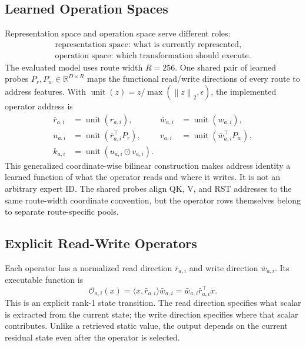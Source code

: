 \documentclass{article}
\newcommand{\norm}[1]{\left\lVert #1 \right\rVert}
\newcommand{\R}{\mathbb{R}}
\newcommand{\od}{\mathbin{\odot}}
\newcommand{\op}{\mathcal{O}}
\begin{document}
\subsection{Learned Operation Spaces}
\label{sec:operation-space}

Representation space and operation space serve different roles:
\[
\begin{array}{l}
\text{representation space: what is currently represented},\\
\text{operation space: which transformation should execute}.
\end{array}
\]
The evaluated model uses route width \(R=256\). One shared pair of learned
probes \(P_r,P_w\in\R^{D\times R}\) maps the functional read/write directions
of every route to address features. With
\(\operatorname{unit}(z)=z/\max(\norm{z}_2,\epsilon)\), the implemented
operator address is
\begin{align}
\bar r_{a,i}&=\operatorname{unit}(r_{a,i}),&
\bar w_{a,i}&=\operatorname{unit}(w_{a,i}),\nonumber\\
u_{a,i}&=\operatorname{unit}(\bar r_{a,i}^{\top}P_r),&
v_{a,i}&=\operatorname{unit}(\bar w_{a,i}^{\top}P_w),\nonumber\\
k_{a,i}&=\operatorname{unit}(u_{a,i}\od v_{a,i}).
\label{eq:rw_address}
\end{align}
This generalized coordinate-wise bilinear construction makes address identity
a learned function of what the operator reads and where it writes. It is not
an arbitrary expert ID. The shared probes align QK, V, and RST addresses to
the same route-width coordinate convention, but the operator rows themselves
belong to separate route-specific pools.

\subsection{Explicit Read-Write Operators}
\label{sec:rw}

Each operator has a normalized read direction \(\bar r_{a,i}\) and write
direction \(\bar w_{a,i}\). Its executable function is
\begin{equation}
\op_{a,i}(x)=\langle x,\bar r_{a,i}\rangle\bar w_{a,i}
=\bar w_{a,i}\bar r_{a,i}^{\top}x.
\label{eq:rw_operator}
\end{equation}
This is an explicit rank-1 state transition. The read direction specifies what
scalar is extracted from the current state; the write direction specifies
where that scalar contributes. Unlike a retrieved static value, the output
depends on the current residual state even after the operator is selected.
\end{document}
